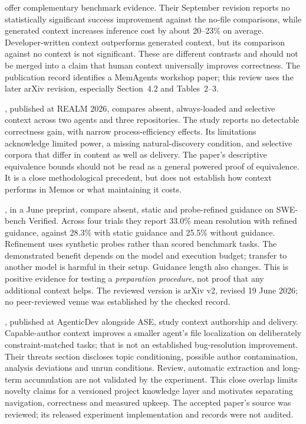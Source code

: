\citet{gloaguen2026} offer complementary benchmark evidence. Their September
revision reports no statistically significant success improvement against the
no-file comparisons, while generated context increases inference cost by about
20--23\% on average. Developer-written context outperforms generated context,
but its comparison against no context is not significant. These are different
contrasts and should not be merged into a claim that human context universally
improves correctness. The publication record identifies a MemAgents workshop
paper; this review uses the later arXiv revision, especially Section~4.2 and
Tables~2--3.

\citet{khatri2026}, published at REALM 2026, compares absent, always-loaded and
selective context across two agents and three repositories. The study reports no
detectable correctness gain, with narrow process-efficiency effects. Its
limitations acknowledge limited power, a missing natural-discovery condition,
and selective corpora that differ in content as well as delivery. The paper's
descriptive equivalence bounds should not be read as a general powered proof
of equivalence. It is a close methodological precedent, but does not establish
how context performs in Memos or what maintaining it costs.

\citet{shepard2026}, in a June preprint, compare absent, static and
probe-refined guidance on SWE-bench Verified. Across four trials they report
33.0\% mean resolution with refined guidance, against 28.3\% with static
guidance and 25.5\% without guidance. Refinement uses synthetic probes rather
than scored benchmark tasks. The demonstrated benefit depends on the model and
execution budget; transfer to another model is harmful in their setup.
Guidance length also changes. This is positive evidence for testing a
\emph{preparation procedure}, not proof that any additional context helps.
The reviewed version is arXiv v2, revised 19 June 2026; no peer-reviewed venue
was established by the checked record.

\citet{kerbel2026}, published at AgenticDev alongside ASE, study context
authorship and delivery. Capable-author context improves a smaller agent's
file localization on deliberately constraint-matched tasks; that is not an
established bug-resolution improvement. Their threats section discloses topic
conditioning, possible author contamination, analysis deviations and unrun
conditions. Review, automatic extraction and long-term accumulation are not
validated by the experiment. This close overlap limits novelty claims for a
versioned project knowledge layer and motivates separating navigation,
correctness and measured upkeep. The accepted paper's source was reviewed;
its released experiment implementation and records were not audited.

